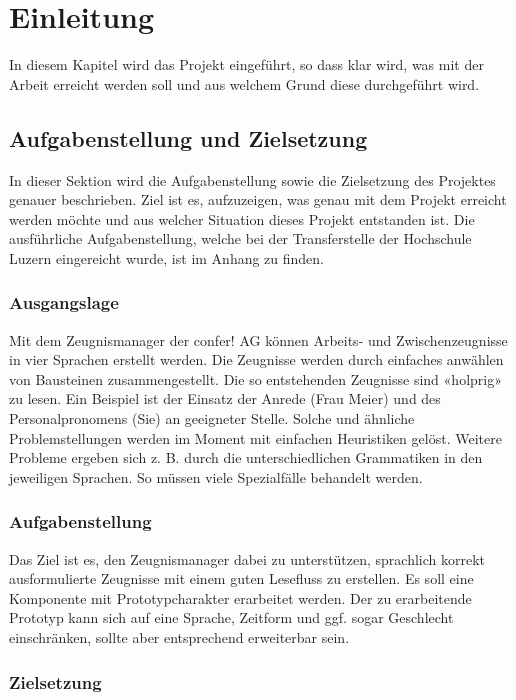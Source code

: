 \chapter{Einleitung}
\label{ch:Einleitung}
In diesem Kapitel wird das Projekt eingeführt, so dass klar wird, was mit der Arbeit erreicht werden soll und aus welchem
Grund diese durchgeführt wird.

\section{Aufgabenstellung und Zielsetzung}
\label{sec:Aufgabenstellung-Zielsetzung}
In dieser Sektion wird die Aufgabenstellung sowie die Zielsetzung des Projektes genauer beschrieben. Ziel ist es,
aufzuzeigen, was genau mit dem Projekt erreicht werden möchte und aus welcher Situation dieses Projekt entstanden ist.
Die ausführliche Aufgabenstellung, welche bei der Transferstelle der Hochschule Luzern eingereicht wurde, ist im Anhang
 zu finden.

\subsection{Ausgangslage}
\label{sub:ausgangslage}
Mit dem Zeugnismanager der confer! AG können Arbeits- und Zwischenzeugnisse in vier Sprachen erstellt werden. Die
Zeugnisse werden durch einfaches anwählen von Bausteinen zusammengestellt. Die so entstehenden Zeugnisse sind «holprig»
zu lesen. Ein Beispiel ist der Einsatz der Anrede (Frau Meier) und des Personalpronomens (Sie) an geeigneter Stelle.
Solche und ähnliche Problemstellungen werden im Moment mit einfachen Heuristiken gelöst. Weitere Probleme ergeben sich
z. B. durch die unterschiedlichen Grammatiken in den jeweiligen Sprachen. So müssen viele Spezialfälle behandelt werden.

\subsection{Aufgabenstellung}
\label{sub:aufgabenstellung}
Das Ziel ist es, den Zeugnismanager dabei zu unterstützen, sprachlich korrekt ausformulierte Zeugnisse mit einem guten
Lesefluss zu erstellen. Es soll eine Komponente mit Prototypcharakter erarbeitet werden. Der zu erarbeitende Prototyp
kann sich auf eine Sprache, Zeitform und ggf. sogar Geschlecht einschränken, sollte aber entsprechend erweiterbar sein.

\subsection{Zielsetzung}
\label{sub:zeilsetzung}

